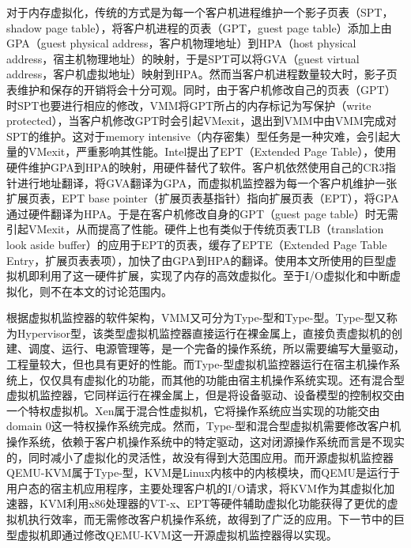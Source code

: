 对于内存虚拟化，传统的方式是为每一个客户机进程维护一个影子页表（SPT，shadow page table），将客户机进程的页表（GPT，guest page table）添加上由GPA（guest physical address，客户机物理地址）到HPA（host physical address，宿主机物理地址）的映射，于是SPT可以将GVA（guest virtual address，客户机虚拟地址）映射到HPA。然而当客户机进程数量较大时，影子页表维护和保存的开销将会十分可观。同时，由于客户机修改自己的页表（GPT）时SPT也要进行相应的修改，VMM将GPT所占的内存标记为写保护（write protected），当客户机修改GPT时会引起VMexit，退出到VMM中由VMM完成对SPT的维护。这对于memory intensive（内存密集）型任务是一种灾难，会引起大量的VMexit，严重影响其性能。Intel提出了EPT（Extended Page Table），使用硬件维护GPA到HPA的映射，用硬件替代了软件。客户机依然使用自己的CR3指针进行地址翻译，将GVA翻译为GPA，而虚拟机监控器为每一个客户机维护一张扩展页表，EPT base pointer（扩展页表基指针）指向扩展页表（EPT），将GPA通过硬件翻译为HPA。于是在客户机修改自身的GPT（guest page table）时无需引起VMexit，从而提高了性能。硬件上也有类似于传统页表TLB（translation look aside buffer）的应用于EPT的页表，缓存了EPTE（Extended Page Table Entry，扩展页表表项），加快了由GPA到HPA的翻译。使用本文所使用的巨型虚拟机即利用了这一硬件扩展，实现了内存的高效虚拟化。至于I/O虚拟化和中断虚拟化，则不在本文的讨论范围内。

根据虚拟机监控器的软件架构，VMM又可分为Type-\uppercase\expandafter{}型和Type-\uppercase\expandafter{}型。Type-\uppercase\expandafter{}型又称为Hypervisor型，该类型虚拟机监控器直接运行在裸金属上，直接负责虚拟机的创建、调度、运行、电源管理等，是一个完备的操作系统，所以需要编写大量驱动，工程量较大，但也具有更好的性能。而Type-\uppercase\expandafter{}型虚拟机监控器运行在宿主机操作系统上，仅仅具有虚拟化的功能，而其他的功能由宿主机操作系统实现。还有混合型虚拟机监控器，它同样运行在裸金属上，但是将设备驱动、设备模型的控制权交由一个特权虚拟机。Xen属于混合性虚拟机，它将操作系统应当实现的功能交由domain 0这一特权操作系统完成。然而，Type-\uppercase\expandafter{}型和混合型虚拟机需要修改客户机操作系统，依赖于客户机操作系统中的特定驱动，这对闭源操作系统而言是不现实的，同时减小了虚拟化的灵活性，故没有得到大范围应用。而开源虚拟机监控器QEMU-KVM属于Type-\uppercase\expandafter{}型，KVM\cite{KVM}是Linux内核中的内核模块，而QEMU\cite{QEMU}是运行于用户态的宿主机应用程序，主要处理客户机的I/O请求，将KVM作为其虚拟化加速器，KVM利用x86处理器的VT-x、EPT等硬件辅助虚拟化功能获得了更优的虚拟机执行效率，而无需修改客户机操作系统，故得到了广泛的应用。下一节中的巨型虚拟机即通过修改QEMU-KVM这一开源虚拟机监控器得以实现。
